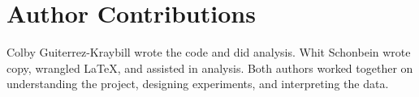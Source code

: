 \section*{Author Contributions}
Colby Guiterrez-Kraybill wrote the code and did analysis. Whit Schonbein wrote copy, wrangled \LaTeX, and assisted in analysis. 
Both authors worked together on understanding the project, designing experiments, and interpreting the data.


